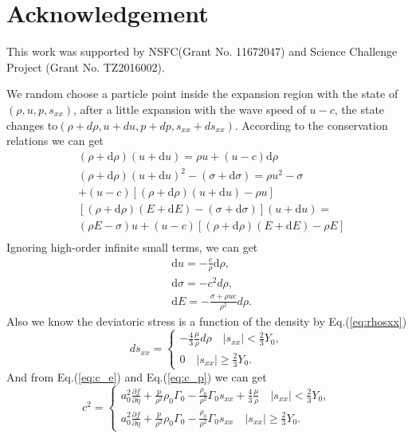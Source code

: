\documentclass[review]{elsarticle}
\begin{document}
%
\section*{Acknowledgement}
This work was supported by NSFC(Grant No. 11672047) and Science Challenge Project (Grant No. TZ2016002).



We random choose a particle point inside the expansion region with the state of $(\rho,u, p,s_{xx})$, after a little expansion with the wave speed of $u-c$, the state changes to$(\rho+d\rho, u+du, p+dp, s_{xx}+ds_{xx})$. According to the conservation relations we can get 
\begin{equation}
  \begin{aligned}
	& (\rho+ \text{d}\rho)(u+ \text{d}u) = \rho u +(u-c)\text{d}\rho\\
	& (\rho+\text{d}\rho)(u+\text{d}u)^2 -(\sigma+\text{d}\sigma)=   \rho u^2-\sigma\\
	&+(u-c)[(\rho+\text{d}\rho)(u+\text{d}u)-\rho u] \\
	& [(\rho+\text{d}\rho)(E+\text{d}E)-(\sigma+\text{d}\sigma)](u+\text{d}u) = \\
	&(\rho E-\sigma)u+(u-c)[(\rho+\text{d}\rho)(E+\text{d}E)-\rho E]\\
 \end{aligned}
\end{equation}
Ignoring high-order infinite small terms, we can get  
\begin{align}
  \label{eq:urho}
  & \text{d} u =-\frac{c}{\rho}\text{d}\rho,\\
\label{eq:sigmarho}
  & \text{d} \sigma = -c^2 d\rho,\\
 \label{eq:Erho}
  & \text{d} E = -\frac{\sigma+\rho u c}{\rho^2} d\rho.
\end{align}
Also we know the deviatoric stress is a function of the  density by Eq.(\ref{eq:rhosxx})   
\begin{equation}
  ds_{xx} = \left\{ \begin{aligned}
	  -\frac{4}{3}\frac{\mu}{\rho}d\rho \quad |s_{xx}| < \frac{2}{3}Y_0,\\
	  0  \quad  |s_{xx}| \ge  \frac{2}{3}Y_0.
	\end{aligned}
  \right.
\end{equation}
And from Eq.(\ref{eq:c_e}) and Eq.(\ref{eq:c_p}) we can get
\begin{equation}\label{eq:c_2rho}
  c^2 = \left\{ \begin{aligned}
	  a_0^2 \frac{\partial f}{\partial \eta} + \frac{p}{\rho^2}\rho_0\Gamma_0 -\frac{\rho_0}{\rho^2}\Gamma_0 s_{xx} +\frac{4}{3}\frac{\mu}{\rho} \quad |s_{xx}| < \frac{2}{3}Y_0,\\
	  a_0^2 \frac{\partial f}{\partial \eta} + \frac{p}{\rho^2}\rho_0\Gamma_0 -\frac{\rho_0}{\rho^2}\Gamma_0 s_{xx}  \quad  |s_{xx}| \ge  \frac{2}{3}Y_0.
	\end{aligned}
  \right.
\end{equation}
\end{document}
